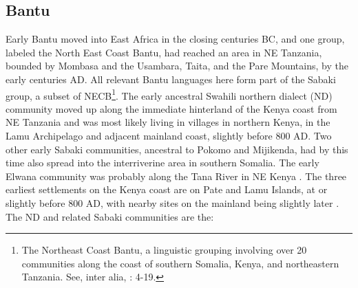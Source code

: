 \documentclass[output=paper,newtxmath,modfonts,nonflat,hidelinks]{langsci/langscibook}
\begin{document}
\subsection{Bantu}\label{sec:nurse:2.3} Early Bantu moved into East Africa in the closing centuries BC, and one group, labeled the North East Coast Bantu, had reached an area in NE Tanzania, bounded by Mombasa and the Usambara, Taita, and the Pare Mountains, by the early centuries AD. All relevant Bantu languages here form part of the Sabaki group, a subset of NECB\footnote{The Northeast Coast Bantu, a linguistic grouping involving  over 20 communities along the coast of southern Somalia, Kenya, and northeastern Tanzania. See, inter alia, \citealt{Nurse1993}: 4-19.}. The early ancestral Swahili northern dialect (ND) community moved up along the immediate hinterland of the Kenya coast from NE Tanzania and was most likely living in villages in northern Kenya, in the Lamu Archipelago and adjacent mainland coast, slightly before 800 AD. Two other early Sabaki communities, ancestral to Pokomo and Mijikenda, had by this time also spread into the interriverine area in southern Somalia. The early Elwana community was probably along the Tana River in NE Kenya \citep[485ff, 499ff]{Nurse1993}. The three earliest settlements on the Kenya coast are on Pate and Lamu Islands, at or slightly before 800 AD, with nearby sites on the mainland being slightly later \citep{Wilson2016}. The ND and related Sabaki communities are the: 
\end{document}
